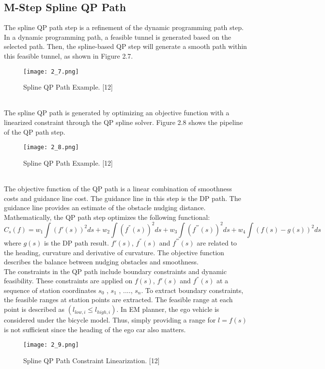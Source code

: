 \documentclass{thesisreport}
\begin{document}
\subsection{M-Step Spline QP Path}
The spline QP path step is a refinement of the dynamic programming path step. In a dynamic programming path, a feasible tunnel is generated based on the selected path. Then, the spline-based QP step will generate a smooth path within this feasible tunnel, as shown in Figure 2.7.
   \begin{figure}[ht]
	\centering
	\texttt{[image: 2\_7.png]}
	\caption{Spline QP Path Example. [12]}
	\label{fig:2.7} 
\end{figure}\\
\indent
The spline QP path is generated by optimizing an objective function with a linearized constraint through the QP spline solver. Figure 2.8 shows the pipeline of the QP path step.
   \begin{figure}[ht]
	\centering
	\texttt{[image: 2\_8.png]}
	\caption{Spline QP Path Example. [12]}
	\label{fig:2.8} 
\end{figure}\\
\indent
The objective function of the QP path is a linear combination of smoothness costs and guidance line cost. The guidance line in this step is the DP path. The guidance line provides an estimate of the obstacle nudging distance. Mathematically, the QP path step optimizes the following functional:
\begin{equation}
C_{s}(f) = w_1 \int (f'(s))^2 ds + w_2 \int (f^{''}(s))^2 ds + w_3 \int (f^{'''}(s))^2 ds + w_4 \int (f(s) - g(s))^2 ds
\end{equation}
where $g(s)$ is the DP path result. $f'(s)$, $f^{''}(s)$ and $f^{'''}(s)$ are related to the heading, curvature and derivative of curvature. The objective function describes the balance between nudging obstacles and smoothness.\\
\indent
The constraints in the QP path include boundary constraints and dynamic feasibility. These constraints are applied on $f(s)$, $f'(s)$ and $f^{''}(s)$ at a sequence of station coordinates $s_0$ , $s_1$ , ...., $s_n$. To extract boundary constraints, the feasible ranges at station points are extracted. The feasible range at each point is described as $(l_{low,i} \leq l_{high,i} )$. In EM planner, the ego vehicle is considered under the bicycle model. Thus, simply providing a range for $l = f(s)$ is not sufficient since the heading of the ego car also matters.
  \begin{figure}[ht]
	\centering
	\texttt{[image: 2\_9.png]}
	\caption{Spline QP Path Constraint Linearization. [12]}
	\label{fig:2.9} 
\end{figure}\\
\end{document}
